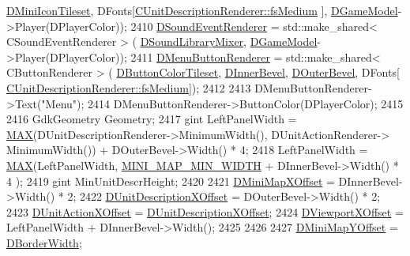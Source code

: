\begin{DoxyCode}
      \hyperlink{classCApplicationData_aa7d7e4c8be514246089546f4d98d74f2}{DMiniIconTileset}, DFonts[\hyperlink{classCUnitDescriptionRenderer_a3ea4cd83b6dd9533ab3abb953a7da35aa7b5aa12d8a01b317ebfbf1bd65d7e568}{CUnitDescriptionRenderer::fsMedium}
      ], \hyperlink{classCApplicationData_a32b50c7c1cbac3cfd67c7f775b1d6fee}{DGameModel}->Player(DPlayerColor));
2410     \hyperlink{classCApplicationData_af2959556fc881145d9d777c627a9345d}{DSoundEventRenderer} = std::make\_shared< CSoundEventRenderer > (
      \hyperlink{classCApplicationData_aa1e6876121bb4fb229ec6b930a8a6766}{DSoundLibraryMixer}, \hyperlink{classCApplicationData_a32b50c7c1cbac3cfd67c7f775b1d6fee}{DGameModel}->Player(DPlayerColor));
2411     \hyperlink{classCApplicationData_a2c9f10aa452454a016e0164f6ce777a6}{DMenuButtonRenderer} = std::make\_shared< CButtonRenderer > (
      \hyperlink{classCApplicationData_a7482e0b4d7e0ce4979eb9f28872023ad}{DButtonColorTileset}, \hyperlink{classCApplicationData_a29a687c44dceb9e87a56d96612d59ab5}{DInnerBevel}, \hyperlink{classCApplicationData_abc2b04aa05148da81145ff6d6bc2bf01}{DOuterBevel}, DFonts[
      \hyperlink{classCUnitDescriptionRenderer_a3ea4cd83b6dd9533ab3abb953a7da35aa7b5aa12d8a01b317ebfbf1bd65d7e568}{CUnitDescriptionRenderer::fsMedium}]);
2412     
2413     DMenuButtonRenderer->Text(\textcolor{stringliteral}{"Menu"});
2414     DMenuButtonRenderer->ButtonColor(DPlayerColor);
2415     
2416     GdkGeometry Geometry; 
2417     gint LeftPanelWidth = \hyperlink{main_8cpp_afa99ec4acc4ecb2dc3c2d05da15d0e3f}{MAX}(DUnitDescriptionRenderer->MinimumWidth(), DUnitActionRenderer->
      MinimumWidth()) + DOuterBevel->Width() * 4;
2418     LeftPanelWidth = \hyperlink{main_8cpp_afa99ec4acc4ecb2dc3c2d05da15d0e3f}{MAX}(LeftPanelWidth, \hyperlink{main_8cpp_a8f16b3eaa5b816dcfd2f60cdc4733a18}{MINI\_MAP\_MIN\_WIDTH} + DInnerBevel->Width() * 4
      );
2419     gint MinUnitDescrHeight;
2420     
2421     \hyperlink{classCApplicationData_ae651b9d3963288c5c1f5aaf53bf9401d}{DMiniMapXOffset} = DInnerBevel->Width() * 2;
2422     \hyperlink{classCApplicationData_a5653b5d0eff32ccd540ad60f5c331c24}{DUnitDescriptionXOffset} = DOuterBevel->Width() * 2;
2423     \hyperlink{classCApplicationData_aa47b53d283617575a4866c08d83e27c4}{DUnitActionXOffset} = \hyperlink{classCApplicationData_a5653b5d0eff32ccd540ad60f5c331c24}{DUnitDescriptionXOffset};
2424     \hyperlink{classCApplicationData_a306bba873ccc47126111305fe21ef3ff}{DViewportXOffset} = LeftPanelWidth + DInnerBevel->Width();
2425     
2426     
2427     \hyperlink{classCApplicationData_ad33fc850bd8262a4bdf1f23e9477d5ad}{DMiniMapYOffset} = \hyperlink{classCApplicationData_a566b69c72fa982c6ecf8e47dc21df489}{DBorderWidth};

\end{DoxyCode}
